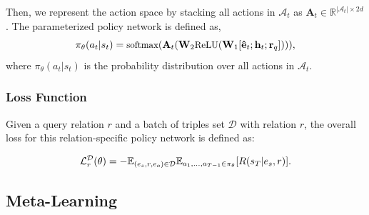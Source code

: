 \documentclass[11pt,a4paper]{article}
\begin{document}
Then, we represent the action space by stacking all actions in $\mathcal{A}_t$ as $\mathbf{A}_t \in \mathbb{R}^{|\mathcal{A}_t| \times 2d}$. The parameterized policy network is defined as,
\begin{equation}
  \small
  \pi_{\theta}(a_t|s_t) = \text{softmax} (\mathbf{A}_t (\mathbf{W}_2 \text{ReLU} (\mathbf{W}_1[\mathbf{\hat{e}}_t;\mathbf{h}_t;\mathbf{r}_q]))),
\end{equation}
where $\pi_{\theta}(a_t|s_t)$ is the probability distribution over all actions in $\mathcal{A}_t$.

\subsubsection{Loss Function}

Given a query relation $r$ and a batch of triples set $\mathcal{D}$ with relation $r$, the overall loss for this relation-specific policy network is defined as:

\begin{equation}
\label{loss_func}
\small
    \mathcal{L}_r^{\mathcal{D}}(\theta) = -\mathbb{E}_{(e_s, r, e_o) \in \mathcal{D} } \mathbb{E}_{a_1, \dots, a_{T-1} \in \pi_{\theta} } [R(s_T|e_s, r)].
\end{equation}



\subsection{Meta-Learning}

\end{document}
